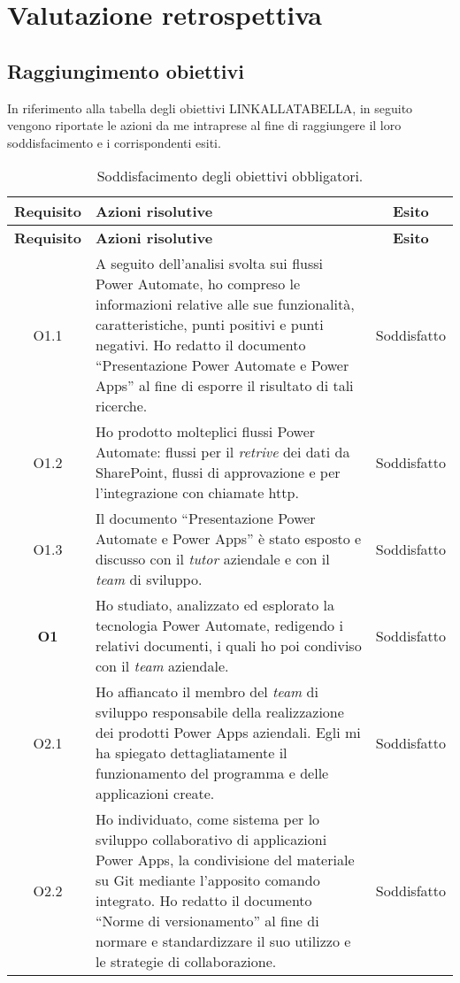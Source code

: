 \chapter{Valutazione retrospettiva}
\label{cap:valutazioneRetrospettiva}
\section{Raggiungimento obiettivi}
In riferimento alla tabella degli obiettivi LINKALLATABELLA, in seguito vengono riportate le azioni da me intraprese al fine di raggiungere il loro soddisfacimento e i corrispondenti esiti.

\begingroup
\renewcommand\arraystretch{1.3}
\begin{longtable}{|c|p{8cm}|c|}
    \caption{Soddisfacimento degli obiettivi obbligatori.}
    \label{tab:soddObbObbligatori}\\
    \hline \textbf{Requisito} & \textbf{Azioni risolutive} & \textbf{Esito}\\ \endfirsthead
    \hline \textbf{Requisito} & \textbf{Azioni risolutive} & \textbf{Esito}\\ \endhead
    \hline \endfoot
    \hline \endlastfoot
    \hline O1.1  & A seguito dell'analisi svolta sui flussi Power Automate, ho compreso le informazioni relative alle sue funzionalità, caratteristiche, punti positivi e punti negativi. Ho redatto il documento “Presentazione Power Automate e Power Apps” al fine di esporre il risultato di tali ricerche. & Soddisfatto\\
    \hline O1.2  & Ho prodotto molteplici flussi Power Automate: flussi per il \emph{retrive} dei dati da SharePoint, flussi di approvazione e per l'integrazione con chiamate \gls{http}. & Soddisfatto\\
    \hline O1.3  & Il documento “Presentazione Power Automate e Power Apps” è stato esposto e discusso con il \emph{tutor} aziendale e con il \emph{team} di sviluppo. & Soddisfatto\\
    \hline \textbf{O1}    & Ho studiato, analizzato ed esplorato la tecnologia Power Automate, redigendo i relativi documenti, i quali ho poi condiviso con il \emph{team} aziendale. & Soddisfatto\\
    \hline O2.1  & Ho affiancato il membro del \emph{team} di sviluppo responsabile della realizzazione dei prodotti Power Apps aziendali. Egli mi ha spiegato dettagliatamente il funzionamento del programma e delle applicazioni create. & Soddisfatto\\
    \hline O2.2  & Ho individuato, come sistema per lo sviluppo collaborativo di applicazioni Power Apps, la condivisione del materiale su Git mediante l'apposito comando integrato. Ho redatto il documento “Norme di versionamento” al fine di normare e standardizzare il suo utilizzo e le strategie di collaborazione. & Soddisfatto\\

\end{longtable}
